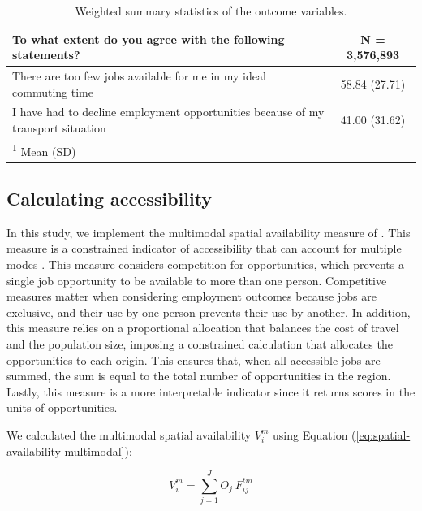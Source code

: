 \documentclass[preprint, 3p,
authoryear]{elsarticle} %
\begin{document}
\begin{table}
\centering
\caption{\label{tab:unnamed-chunk-1}\label{tab:out-description}Weighted summary statistics of the outcome variables.}
\centering
\fontsize{10}{12}\selectfont
\begin{tabular}[t]{lc}
\toprule
To what extent do you agree with the following statements? & \textbf{N = 3,576,893}\\
\midrule
There are too few jobs available for me in my ideal commuting time & 58.84 (27.71)\\
I have had to decline employment opportunities because of my transport situation & 41.00 (31.62)\\
\bottomrule
\multicolumn{2}{l}{\rule{0pt}{1em}\textsuperscript{1} Mean (SD)}\\
\end{tabular}
\end{table}

\subsection{Calculating accessibility}\label{calculating-accessibility}

In this study, we implement the multimodal spatial availability measure
of \citet{soukhov2024}. This measure is a constrained indicator of
accessibility that can account for multiple modes
\citep[see][]{soukhov2023, soukhov2025}. This measure considers
competition for opportunities, which prevents a single job opportunity
to be available to more than one person. Competitive measures matter
when considering employment outcomes because jobs are exclusive, and
their use by one person prevents their use by another. In addition, this
measure relies on a proportional allocation that balances the cost of
travel and the population size, imposing a constrained calculation that
allocates the opportunities to each origin. This ensures that, when all
accessible jobs are summed, the sum is equal to the total number of
opportunities in the region. Lastly, this measure is a more
interpretable indicator since it returns scores in the units of
opportunities.

We calculated the multimodal spatial availability \(V_i^m\) using
Equation (\ref{eq:spatial-availability-multimodal}):

\begin{equation}
\label{eq:spatial-availability-multimodal}
V^m_{i} = \sum_{j=1}^J O_j\ F^{tm}_{ij}
\end{equation}
\end{document}
